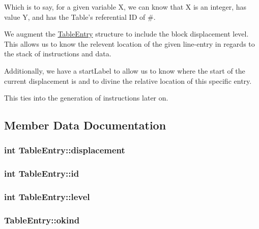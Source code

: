 Which is to say, for a given variable X, we can know that X is an integer, has value Y, and has the Table's referential ID of \#.

We augment the \hyperlink{structTableEntry}{TableEntry} structure to include the block displacement level. This allows us to know the relevent location of the given line-\/entry in regards to the stack of instructions and data.

Additionally, we have a startLabel to allow us to know where the start of the current displacement is and to divine the relative location of this specific entry.

This ties into the generation of instructions later on. 

\subsection{Member Data Documentation}
\hypertarget{structTableEntry_ac0ba3c406ece114defb6575a8412e489}{
\subsubsection[{displacement}]{\setlength{\rightskip}{0pt plus 5cm}int {\bf TableEntry::displacement}}}
\label{structTableEntry_ac0ba3c406ece114defb6575a8412e489}
\hypertarget{structTableEntry_aded1f22bfcb60027c8adac8d927deb43}{
\subsubsection[{id}]{\setlength{\rightskip}{0pt plus 5cm}int {\bf TableEntry::id}}}
\label{structTableEntry_aded1f22bfcb60027c8adac8d927deb43}
\hypertarget{structTableEntry_a4b9ee2cf034f9074da07205bc4ed8fc6}{
\subsubsection[{level}]{\setlength{\rightskip}{0pt plus 5cm}int {\bf TableEntry::level}}}
\label{structTableEntry_a4b9ee2cf034f9074da07205bc4ed8fc6}
\hypertarget{structTableEntry_a74160c41838c43ac2869239d33bea3e0}{
\subsubsection[{okind}]{ {\bf TableEntry::okind}}}
